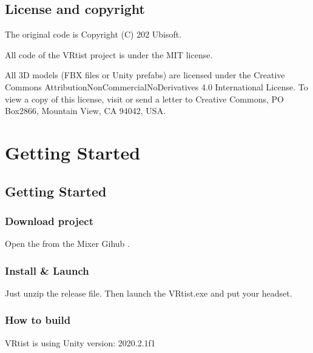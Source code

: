 \documentclass[letterpaper,10pt,english,openany,oneside]{sphinxmanual}
\begin{document}
\section{License and copyright}
\label{\detokenize{index:license-and-copyright}}
\sphinxAtStartPar
The original code is Copyright (C) 202 Ubisoft.

\sphinxAtStartPar
All code of the VRtist project is under the MIT license.

\sphinxAtStartPar
All 3D models (FBX files or Unity prefabs) are licensed under the Creative Commons Attribution\sphinxhyphen{}NonCommercial\sphinxhyphen{}NoDerivatives 4.0 International License.
To view a copy of this license, visit  or send a letter to Creative Commons, PO Box2866, Mountain View, CA 94042, USA.


\chapter{Getting Started}
\label{\detokenize{index:getting-started}}

\section{Getting Started}
\label{\detokenize{Start/GettingStarted:getting-started}}\label{\detokenize{Start/GettingStarted::doc}}

\subsection{Download project}
\label{\detokenize{Start/GettingStarted:download-project}}
\sphinxAtStartPar
Open the   from the Mixer Gihub .


\subsection{Install \& Launch}
\label{\detokenize{Start/GettingStarted:install-launch}}
\sphinxAtStartPar
Just unzip the release file. Then launch the VRtist.exe and put your headset.


\subsection{How to build}
\label{\detokenize{Start/GettingStarted:how-to-build}}
\sphinxAtStartPar
VRtist is using Unity version: 2020.2.1f1
\end{document}
